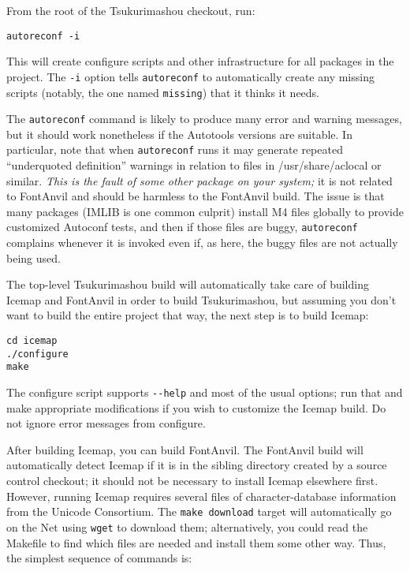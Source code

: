 From the root of the Tsukurimashou checkout, run:
\begin{verbatim}
autoreconf -i
\end{verbatim}

This will create configure scripts and other infrastructure for all packages
in the project.  The \texttt{-i} option tells \texttt{autoreconf} to
automatically create any missing scripts (notably, the one named
\texttt{missing}) that it thinks it needs.

The \texttt{autoreconf} command
is likely to produce many error and warning messages, but it should work
nonetheless if the Autotools versions are suitable.  In particular, note
that when \texttt{autoreconf} runs it may generate repeated ``underquoted
definition'' warnings in relation to files in /usr/share/aclocal or similar. 
\emph{This is the fault of some other package on your system;} it is not
related to FontAnvil and should be harmless to the FontAnvil build.  The
issue is that many packages (IMLIB is one common culprit) install M4 files
globally to provide customized Autoconf tests, and then if those files are
buggy, \texttt{autoreconf} complains whenever it is invoked even if, as
here, the buggy files are not actually being used.

The top-level Tsukurimashou build will automatically take care of building
Icemap and FontAnvil in order to build Tsukurimashou, but assuming you don't
want to build the entire project that way, the next step is to build Icemap:

\begin{verbatim}
cd icemap
./configure
make
\end{verbatim}

The configure script supports \texttt{-{}-help} and most of the usual
options; run that and make appropriate modifications if you wish to
customize the Icemap build.  Do not ignore error messages from configure.

After building Icemap, you can build FontAnvil.  The FontAnvil build will
automatically detect Icemap if it is in the sibling directory created by a
source control checkout; it should not be necessary to install Icemap
elsewhere first.  However, running Icemap requires several files of
character-database information from the Unicode Consortium.  The
\texttt{make download} target will automatically go on the Net using
\texttt{wget} to download them; alternatively, you could read the Makefile
to find which files are needed and install them some other way.  Thus, the
simplest sequence of commands is:

